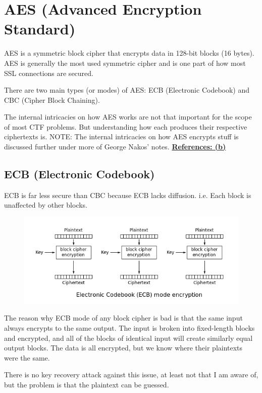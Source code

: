 \documentclass{report}
\begin{document}
\chapter{AES (Advanced Encryption Standard)}
AES is a \color{blue} symmetric block cipher \color{black} that encrypts data in 128-bit blocks (16 bytes).  AES is generally the most used symmetric cipher and is one part of how most SSL connections are secured.

There are two main types (or modes) of AES: ECB (Electronic Codebook) and CBC (Cipher Block Chaining).

The internal intricacies on how AES works are not that important for the scope of most CTF problems.  But understanding how each produces their respective ciphertexts is.
NOTE: The internal intricacies on how AES encrypts stuff is discussed further under more of George Nakos' notes. \hyperref[ref:6]{\textbf{References: (b)}}

\section{ECB (Electronic Codebook)}
ECB is far less secure than CBC because ECB lacks \color{blue} diffusion\color{black}.  i.e. Each block is unaffected by other blocks.
\begin{figure}[h!]
  \includegraphics[width=\linewidth]{ECB_Walkthrough_.png}
\end{figure}

The reason why ECB mode of any block cipher is bad is that the same input always encrypts to the same output. The input is broken into fixed-length blocks and encrypted, and all of the blocks of identical input will create similarly equal output blocks. The data is all encrypted, but we know where their plaintexts were the same. 

There is no key recovery attack against this issue, at least not that I am aware of, but the problem is that the plaintext can be guessed.
\end{document}
